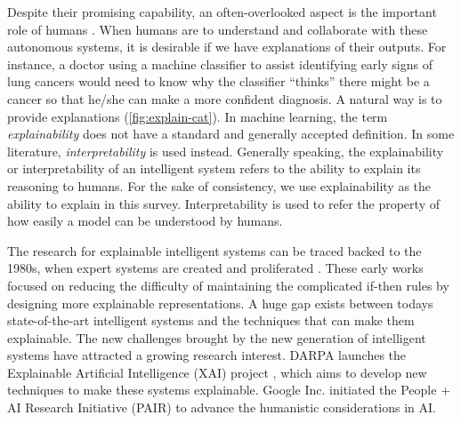 Despite their promising capability, an often-overlooked aspect is the important role of humans \cite{ribeiro2016kdd}. When humans are to understand and collaborate with these autonomous systems, it is desirable if we have explanations of their outputs. For instance, a doctor using a machine classifier to assist identifying early signs of lung cancers would need to know why the classifier ``thinks'' there might be a cancer so that he/she can make a more confident diagnosis. A natural way is to provide explanations (\autoref{fig:explain-cat}). In machine learning, the term \textit{explainability} does not have a standard and generally accepted definition. In some literature, \textit{interpretability} is used instead. Generally speaking, the explainability or interpretability of an intelligent system refers to the ability to explain its reasoning \cite{doshi-velez2017interpretableml} to humans. For the sake of consistency, we use explainability as the ability to explain in this survey. Interpretability is used to refer the property of how easily a model can be understood by humans.

The research for explainable intelligent systems can be traced backed to the 1980s, when expert systems are created and proliferated \cite{clancey1981tech, neches1985tse, swartout1991expert}. These early works focused on reducing the difficulty of maintaining the complicated if-then rules by designing more explainable representations. A huge gap exists between todays state-of-the-art intelligent systems and the techniques that can make them explainable. The new challenges brought by the new generation of intelligent systems have attracted a growing research interest. DARPA launches the Explainable Artificial Intelligence (XAI) project \cite{darpa2017xai}, which aims to develop new techniques to make these systems explainable. Google Inc. initiated the People + AI Research Initiative (PAIR) \cite{google2017pair} to advance the humanistic considerations in AI. 


